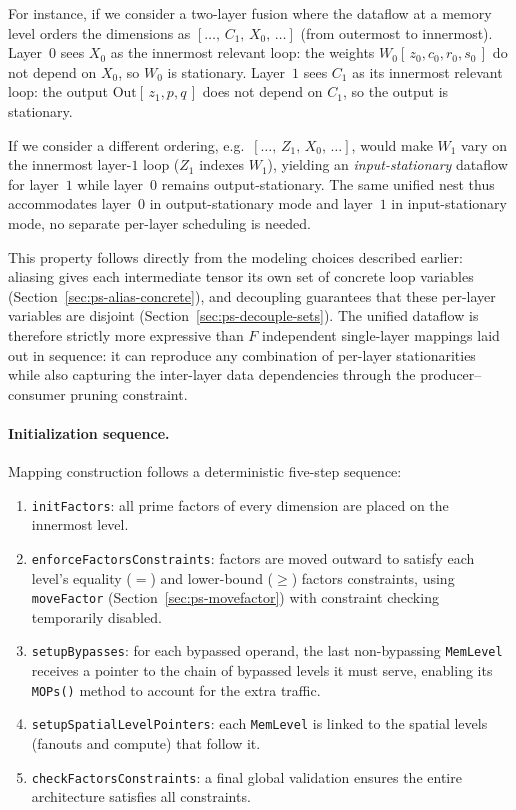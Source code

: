 For instance, if we consider a two-layer fusion where the dataflow at a
memory level orders the dimensions as
$[\ldots,\, C_1,\, X_0,\, \ldots]$ (from outermost to innermost).
Layer~$0$ sees $X_0$ as the innermost relevant loop: the weights
$W_0[\,z_0, c_0, r_0, s_0\,]$ do not depend on $X_0$, so $W_0$ is
stationary.
Layer~$1$ sees $C_1$ as its innermost relevant loop: the output
$\text{Out}[\,z_1, p, q\,]$ does not depend on $C_1$, so the output
is stationary.

If we consider a different ordering, e.g.\
$[\ldots,\, Z_1,\, X_0,\, \ldots]$, would make
$W_1$ vary on the innermost layer-$1$ loop ($Z_1$ indexes $W_1$),
yielding an \emph{input-stationary} dataflow for layer~$1$ while
layer~$0$ remains output-stationary.
The same unified nest thus accommodates layer~$0$ in output-stationary
mode and layer~$1$ in input-stationary mode, no separate per-layer
scheduling is needed.

This property follows directly from the modeling choices described
earlier: aliasing gives each intermediate tensor its own set of
concrete loop variables (Section~\ref{sec:ps-alias-concrete}), and
decoupling guarantees that these per-layer variables are disjoint
(Section~\ref{sec:ps-decouple-sets}).
The unified dataflow is therefore strictly more expressive than $F$
independent single-layer mappings laid out in sequence: it can
reproduce any combination of per-layer stationarities while also
capturing the inter-layer data dependencies through the
producer--consumer pruning constraint.

\paragraph{Initialization sequence.}
Mapping construction follows a deterministic five-step sequence:
\begin{enumerate}
  \item \texttt{initFactors}: all prime factors of every dimension
        are placed on the innermost level.
  \item \texttt{enforceFactorsConstraints}: factors are moved outward
        to satisfy each level's equality ($=$) and lower-bound
        ($\ge$) factors constraints, using \texttt{moveFactor}
        (Section~\ref{sec:ps-movefactor}) with constraint checking
        temporarily disabled.
  \item \texttt{setupBypasses}: for each bypassed operand, the last
        non-bypassing \texttt{MemLevel} receives a pointer to the
        chain of bypassed levels it must serve, enabling its
        \texttt{MOPs()} method to account for the extra traffic.
  \item \texttt{setupSpatialLevelPointers}: each \texttt{MemLevel}
        is linked to the spatial levels (fanouts and compute) that
        follow it.
  \item \texttt{checkFactorsConstraints}: a final global validation
        ensures the entire architecture satisfies all constraints.
\end{enumerate}

